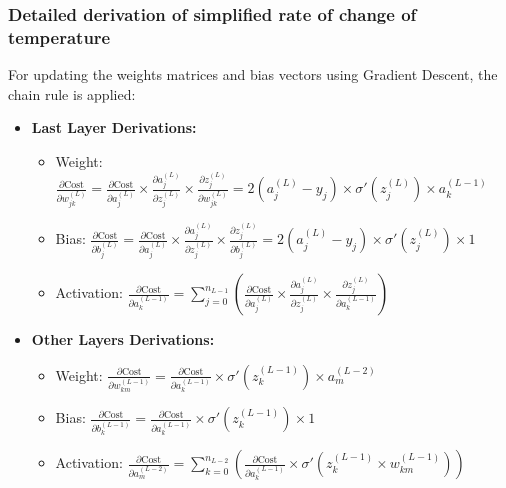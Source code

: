 \documentclass[12pt]{article}
\begin{document}
\subsubsection*{Detailed derivation of simplified rate of change of temperature}


For updating the weights matrices and bias vectors using Gradient Descent, the chain rule is applied:

\begin{itemize}
  \item \textbf{Last Layer Derivations:} 

  \begin{itemize}
    \item Weight:
    $\frac{\partial \text{Cost}}{\partial w_{jk}^{(L)}} = 
    \frac{\partial \text{Cost}}{\partial a_j^{(L)}} \times 
    \frac{\partial a_j^{(L)}}{\partial z_j^{(L)}} \times 
    \frac{\partial z_j^{(L)}}{\partial w_{jk}^{(L)}} = 
    2(a_j^{(L)} - y_j) \times \sigma'(z_j^{(L)}) \times a_k^{(L-1)}$

    \item Bias:
    $\frac{\partial \text{Cost}}{\partial b_j^{(L)}} = 
    \frac{\partial \text{Cost}}{\partial a_j^{(L)}} \times 
    \frac{\partial a_j^{(L)}}{\partial z_j^{(L)}} \times 
    \frac{\partial z_j^{(L)}}{\partial b_j^{(L)}} = 
    2(a_j^{(L)} - y_j) \times \sigma'(z_j^{(L)}) \times 1$

    \item Activation:
    $\frac{\partial \text{Cost}}{\partial a_k^{(L-1)}} = 
    \sum_{j=0}^{n_{L-1}} \left( 
    \frac{\partial \text{Cost}}{\partial a_j^{(L)}} \times 
    \frac{\partial a_j^{(L)}}{\partial z_j^{(L)}} \times 
    \frac{\partial z_j^{(L)}}{\partial a_k^{(L-1)}} 
    \right)$
    
  \end{itemize}

  \item \textbf{Other Layers Derivations:} 

  \begin{itemize}
    \item Weight:
    $\frac{\partial \text{Cost}}{\partial w_{km}^{(L-1)}} = 
    \frac{\partial \text{Cost}}{\partial a_k^{(L-1)}} \times 
    \sigma'(z_k^{(L-1)}) \times 
    a_m^{(L-2)}$
    
    \item Bias:
    $\frac{\partial \text{Cost}}{\partial b_k^{(L-1)}} = 
    \frac{\partial \text{Cost}}{\partial a_k^{(L-1)}} \times 
    \sigma'(z_k^{(L-1)}) \times 
    1$
    
    \item Activation:
    $\frac{\partial \text{Cost}}{\partial a_m^{(L-2)}} = 
    \sum_{k=0}^{n_{L-2}} \left( 
    \frac{\partial \text{Cost}}{\partial a_k^{(L-1)}} \times 
    \sigma'(z_k^{(L-1)} \times w_{km}^{(L-1)}) 
    \right)$
  \end{itemize}

\end{itemize}
\end{document}
